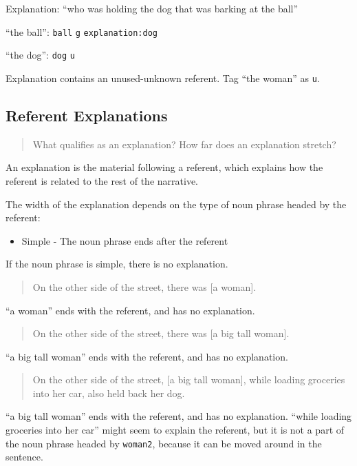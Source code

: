 \documentclass[
]{book}
\providecommand{\tightlist}{%
  \setlength{\itemsep}{0pt}\setlength{\parskip}{0pt}}
\begin{document}
Explanation: ``who was holding the dog that was barking at the ball''

``the ball'': \texttt{ball} \texttt{g} \texttt{explanation:dog}

``the dog'': \texttt{dog} \texttt{u}

Explanation contains an unused-unknown referent.
Tag ``the woman'' as \texttt{u}.

\hypertarget{referent-explanations}{%
\subsection{Referent Explanations}\label{referent-explanations}}

\begin{quote}
What qualifies as an explanation?
How far does an explanation stretch?
\end{quote}

An explanation is the material following a referent,
which explains how the referent is related to the rest of the narrative.

The width of the explanation depends on the type of noun phrase headed by the referent:

\begin{itemize}
\tightlist
\item
  Simple - The noun phrase ends after the referent
\end{itemize}

If the noun phrase is simple, there is no explanation.

\begin{quote}
On the other side of the street,
there was {[}a woman{]}.
\end{quote}

``a woman'' ends with the referent, and has no explanation.

\begin{quote}
On the other side of the street,
there was {[}a big tall woman{]}.
\end{quote}

``a big tall woman'' ends with the referent, and has no explanation.

\begin{quote}
On the other side of the street,
{[}a big tall woman{]}, while loading groceries into her car,
also held back her dog.
\end{quote}

``a big tall woman'' ends with the referent, and has no explanation.
``while loading groceries into her car'' might seem to explain the referent,
but it is not a part of the noun phrase headed by \texttt{woman2},
because it can be moved around in the sentence.
\end{document}
